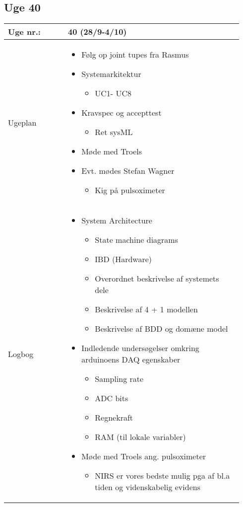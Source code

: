 	\subsection{Uge 40} \label{app:logUge40}
	\begin{longtable}{|p{0.24\linewidth}|p{0.7\linewidth}|}
		\hline
		Uge nr.: & 40 (28/9-4/10)\\ \hline
		Ugeplan & 
		\begin{itemize}
			\item Følg op joint tupes fra Rasmus
			\item Systemarkitektur 
			\begin{itemize}
				\item UC1- UC8
			\end{itemize}
			\item Kravspec og accepttest
			\begin{itemize}
				\item Ret sysML
			\end{itemize}
			\item Møde med Troels
			\item Evt. mødes Stefan Wagner
			\begin{itemize}
				\item Kig på pulsoximeter
			\end{itemize}
		\end{itemize}
		
		\\ \hline
		Logbog & 
		\begin{itemize}
			\item System Architecture
			\begin{itemize}
				\item State machine diagrams
				\item IBD (Hardware)
				\item Overordnet beskrivelse af systemets dele
				\item Beskrivelse af 4 + 1 modellen
				\item Beskrivelse af BDD og domæne model
			\end{itemize}
			\item Indledende undersøgelser omkring arduinoens DAQ egenskaber
			\begin{itemize}
				\item Sampling rate
				\item ADC bits
				\item Regnekraft
				\item RAM (til lokale variabler)
			\end{itemize}
			\item Møde med Troels ang. pulsoximeter
			\begin{itemize}
				\item NIRS er vores bedste mulig pga af bl.a tiden og videnskabelig evidens
			\end{itemize}
		\end{itemize}
		\\ \hline
	\end{longtable}
	
